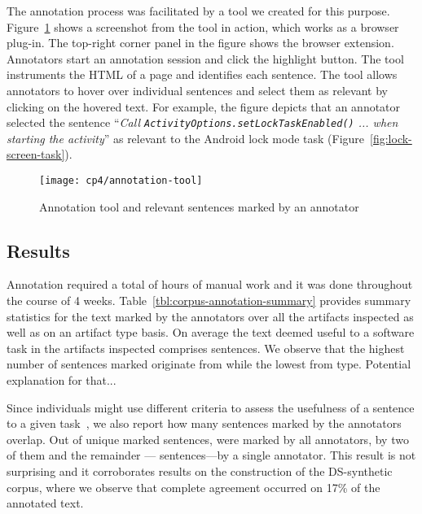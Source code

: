 The annotation process was facilitated by a tool we created for this purpose. Figure~\ref{fig:corpus-annotation-tool} shows a screenshot from the tool in 
action, which works as a browser plug-in. The top-right corner panel in the figure shows the browser extension. Annotators  start an annotation session and click the highlight button.
The tool instruments the HTML of a page and identifies each sentence. The tool allows annotators to hover over individual sentences and select them as relevant by clicking on the hovered text. For example, the figure depicts that an annotator selected  the sentence
``\textit{Call {\small \texttt{ActivityOptions.setLockTaskEnabled()}} ... when starting the activity}'' as relevant to the Android lock mode task (Figure~\ref{fig:lock-screen-task}).







\begin{figure}
    \centering
    \texttt{[image: cp4/annotation-tool]}
    \caption{Annotation tool and relevant sentences marked by an annotator}
    \label{fig:corpus-annotation-tool}
\end{figure}




\subsection{Results}


Annotation required a total of  hours of manual work and it was done throughout the course of 4 weeks.
Table~\ref{tbl:corpus-annotation-summary} provides summary statistics for the text marked by 
the annotators over all the artifacts inspected as well as on an artifact type basis.
On average the text deemed useful to a software task in the artifacts inspected comprises 
 sentences. 
We observe that the highest number of sentences marked originate from 
while the lowest from  type. Potential explanation for that...











Since individuals might use different criteria to
assess the usefulness of a sentence to a given task~\cite{Barry1994, Barry1998, Freund2015},
we also report how many sentences marked by the annotators overlap.
Out of 
unique marked
sentences, 
 were marked by all annotators,
 by two of them and the remainder
--- sentences---by a single annotator.
This result is not surprising and it corroborates 
results on the construction of the \acs{DS-synthetic} 
corpus, where we observe that complete agreement 
occurred on 17\% of the annotated text.



